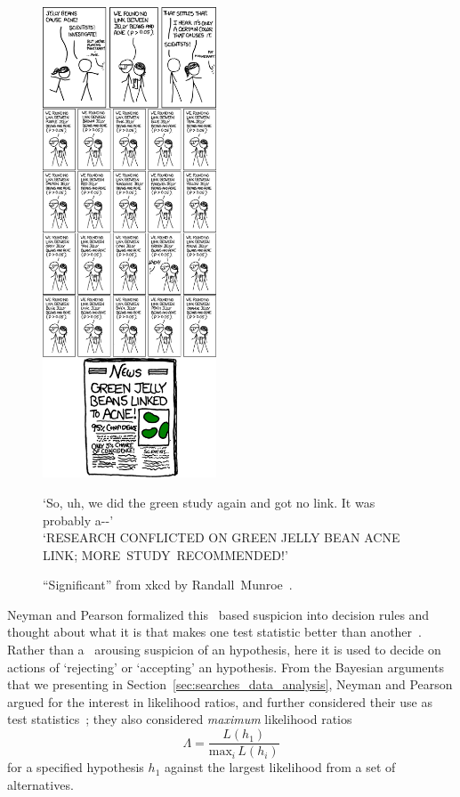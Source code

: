 \begin{figure}[tp]
\centering
\includegraphics[width=0.46\textwidth]{figures/searches_significant_shrink.png}
\\
\begin{footnotesize}
`So, uh, we did the green study again and got no link. It was probably a{-}{-}'
\\
`RESEARCH CONFLICTED ON GREEN JELLY BEAN ACNE LINK; MORE~STUDY~RECOMMENDED!'
\end{footnotesize}
\caption[
``Significant'' from xkcd by Randall~Munroe
]{%
``Significant'' from xkcd by Randall~Munroe~\cite{xkcd2011significant}.
}
\label{fig:searches_significant}
\end{figure}

Neyman and Pearson formalized this \pvalue\ based suspicion into decision
rules and thought about what it is that makes one test statistic better than
another~\cite{neymanpearson1928max, neymanpearson1933lemma}.
Rather than a \pvalue\ arousing suspicion of an hypothesis, here it is used
to decide on actions of `rejecting' or `accepting' an hypothesis.
From the Bayesian arguments that we presenting in
Section~\ref{sec:searches_data_analysis},
Neyman and Pearson argued for the interest in likelihood ratios, and further
considered their use as test statistics~\cite{neymanpearson1928max};
they also considered \emph{maximum} likelihood ratios
\begin{equation}
\Lambda =
\frac{L(h_1)}{\mathrm{max}_i\,L(h_i)}
\end{equation}
for a specified hypothesis $h_1$ against the largest likelihood from a set
of alternatives.

